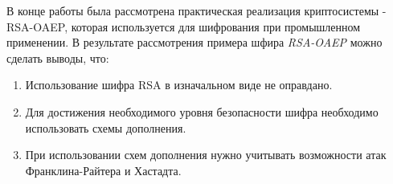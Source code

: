 	В конце работы была рассмотрена практическая реализация криптосистемы - RSA-OAEP, которая используется для шифрования при промышленном применении. В результате рассмотрения примера шфира \textit{RSA-OAEP} можно сделать выводы, что:
		\begin{enumerate}
			\item Использование шифра RSA в изначальном виде не оправдано.
			\item Для достижения необходимого уровня безопасности шифра необходимо использовать схемы дополнения.
			\item При использовании схем дополнения нужно учитывать возможности атак Франклина-Райтера и Хастадта.
		\end{enumerate}